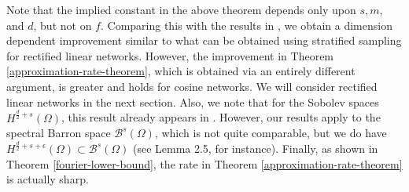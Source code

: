Note that the implied constant in the above theorem depends only upon $s,m$, and $d$, but not on $f$. Comparing this with the results in \cite{jones1992simple}, we obtain a dimension dependent improvement similar to what can be obtained using stratified sampling \cite{klusowski2018approximation} for rectified linear networks. However, the improvement in Theorem \ref{approximation-rate-theorem}, which is obtained via an entirely different argument, is greater and holds for cosine networks. We will consider rectified linear networks in the next section. Also, we note that for the Sobolev spaces $H^{\frac{d}{2} + s}(\Omega)$, this result already appears in \cite{petrushev1998approximation} . However, our results apply to the spectral Barron space $\mathcal{B}^s(\Omega)$, which is not quite comparable, but we do have $H^{\frac{d}{2} + s + \epsilon}(\Omega)\subset \mathcal{B}^s(\Omega)$ (see \cite{CiCP-28-1707} Lemma 2.5, for instance). Finally, as shown in Theorem \ref{fourier-lower-bound}, the rate in Theorem \ref{approximation-rate-theorem} is actually sharp.

